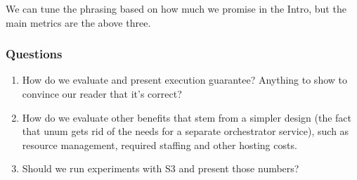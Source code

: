 We can tune the phrasing based on how much we promise in the Intro, but the
main metrics are the above three.

\subsubsection{Questions}

\begin{enumerate}

    \item How do we evaluate and present execution guarantee? Anything to show
     to convince our reader that it's correct?

    \item How do we evaluate other benefits that stem from a simpler design
     (the fact that unum gets rid of the needs for a separate orchestrator
     service), such as resource management, required staffing and other
     hosting costs.

    \item Should we run experiments with S3 and present those numbers?

\end{enumerate}


